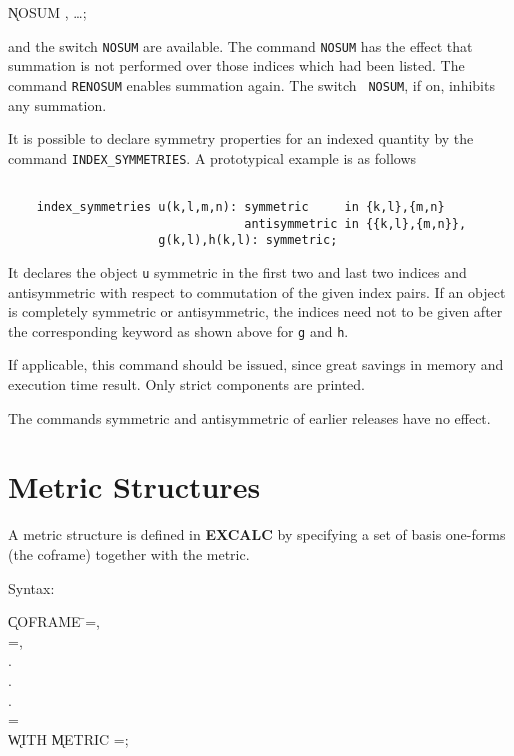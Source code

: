 \hspace*{2em} \k{NOSUM} , \ldots;\label{NOSUM}

and the switch {\tt NOSUM} are 
available.  The command {\tt NOSUM} has the effect that summation is
not performed over those indices which had been listed.  The command
{\tt RENOSUM}\label{RENOSUM} enables summation again.  The switch {\tt
NOSUM}, if on, inhibits any summation. 

\label{INDEXSYMMETRIES} 
It is possible to declare symmetry properties for an indexed quantity by
the command {\tt INDEX\_SYMMETRIES}. A prototypical example is as
follows

\begin{verbatim}

    index_symmetries u(k,l,m,n): symmetric     in {k,l},{m,n}
                                 antisymmetric in {{k,l},{m,n}},
                     g(k,l),h(k,l): symmetric;

\end{verbatim}

It declares the object {\tt u} symmetric in the first two and last
two indices and antisymmetric with respect to commutation of the given
index pairs. If an object is completely symmetric or antisymmetric,
the indices need not to be given after the corresponding keyword as
shown above for {\tt g} and {\tt h}.

If applicable, this command should
be issued, since great savings in memory and execution time result.
Only strict components are printed.

The commands symmetric and antisymmetric of earlier releases have no
effect.


\section{Metric Structures}

 
A metric structure is defined in {\bf EXCALC} by specifying a set of
basis one-forms (the coframe) together with the metric.

Syntax:\label{COFRAME}

\begin{tabbing}
\hspace*{2em} \k{COFRAME} \=
=, \\
\> =, \\
\> . \\
\> . \\
\> . \\
\> = \\
\> \hspace{1em} \k{WITH} \k{METRIC} =; \\
\end{tabbing}

